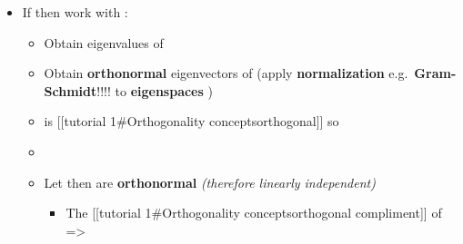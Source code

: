 \begin{itemize}
  \begin{itemize}
  
  \item
    If  then work with
    :

    \begin{itemize}
    
    \item
      Obtain eigenvalues
       of
    \item
      Obtain \textbf{orthonormal} eigenvectors
       of
       (apply \textbf{normalization}
      e.g.~\textbf{Gram-Schmidt}!!!! to \textbf{eigenspaces}
      )
    \item
      is {[}{[}tutorial 1\#Orthogonality
      concepts\textbar orthogonal{]}{]} so 
    \item
    \item
      Let
      then
       are
      \textbf{orthonormal} \emph{(therefore linearly independent)}

      \begin{itemize}
      
      \item
        The {[}{[}tutorial 1\#Orthogonality concepts\textbar orthogonal
        compliment{]}{]} of
        =\textgreater{}

        \begin{itemize}
        

\end{itemize}
\end{itemize}
\end{itemize}
\end{itemize}
\end{itemize}
